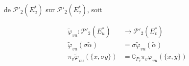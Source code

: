 de $\mathcal P'_2(E_u^*)$ sur $\mathcal P'_2(E_v^*)$, soit \deleted{$\varphi$}

\[
\begin{aligned}
\widetilde\varphi_{vu}:\mathcal P'_2(E_u^*)&\longrightarrow\mathcal P'_2(E_v^*)\\
\widetilde\varphi_{vu}(\sigma\widetilde\alpha)&=\sigma\widetilde\varphi_{vu}(\widetilde\alpha)\\
\pi_v\widetilde\varphi_{vu}(\{x,\sigma y\})&=\complement_{P_v}\pi_v\varphi_{vu}(\{x,y\})
\end{aligned}
\]
